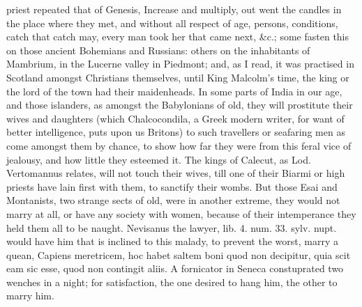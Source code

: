 {priest repeated that of Genesis, Increase and multiply, out went
the candles in the place where they met, and without all respect of
age, persons, conditions, catch that catch may, every man took her that
came next, \&c.; some fasten this on those ancient Bohemians and
Russians: others on the inhabitants of Mambrium, in the Lucerne
valley in Piedmont; and, as I read, it was practised in Scotland
amongst Christians themselves, until King Malcolm's time, the king or
the lord of the town had their maidenheads. In some parts of
India in our age, and those islanders, as amongst the
Babylonians of old, they will prostitute their wives and daughters
(which Chalcocondila, a Greek modern writer, for want of better
intelligence, puts upon us Britons) to such travellers or seafaring men
as come amongst them by chance, to show how far they were from this
feral vice of jealousy, and how little they esteemed it. The kings of
Calecut, as Lod. Vertomannus relates, will not touch their wives,
till one of their Biarmi or high priests have lain first with them, to
sanctify their wombs. But those Esai and Montanists, two strange sects
of old, were in another extreme, they would not marry at all, or have
any society with women, because of their intemperance they held
them all to be naught. Nevisanus the lawyer, lib. 4. num. 33. sylv.
nupt. would have him that is inclined to this malady, to prevent the
worst, marry a quean, Capiens meretricem, hoc habet saltem boni quod
non decipitur, quia scit eam sic esse, quod non contingit aliis. A
fornicator in Seneca constuprated two wenches in a night; for
satisfaction, the one desired to hang him, the other to marry him.

}
